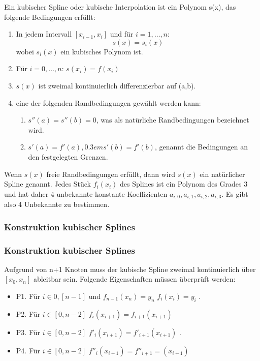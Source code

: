 {		
		Ein kubischer Spline oder kubische Interpolation ist ein Polynom s(x), das folgende Bedingungen erfüllt:
		\begin{enumerate}
			\item In jedem Intervall \([x_{i-1}, x_i]\) und für \(i= 1, \dots , n\):\[ s(x) = s_i(x)\] wobei \(s_i(x)\) ein kubisches Polynom ist.
			\item Für \(i=0,\dots,n\):\hspace{0.7em} \(s(x_i)=f(x_i)\)
			\item \(s(x)\) ist zweimal kontinuierlich differenzierbar auf (a,b).
			\item eine der folgenden Randbedingungen gewählt werden kann:
			\begin{enumerate}
				\item \(s''(a)=s''(b)=0\), was als natürliche Randbedingungen bezeichnet wird.
				\item \(s'(a)=f'(a) ,{0.3em} s'(b)=f'(b)\), genannt die Bedingungen an den festgelegten Grenzen.
			\end{enumerate}
		\end{enumerate}
		
		
		Wenn \(s(x)\) freie Randbedingungen erfüllt, dann wird \(s(x)\) ein natürlicher Spline genannt. 
		Jedes Stück \(f_i(x_i)\) des Splines ist ein Polynom des Grades 3 und hat daher 4 unbekannte konstante Koeffizienten \(a_{i,0},a_{i,1},a_{i,2},a_{i,3}\). Es gibt also 4 Unbekannte zu bestimmen.
		
		\subsubsection{Konstruktion kubischer Splines}
		\begin{frame}
			\frametitle{Konstruktion kubischer Splines}
			Aufgrund von n+1 Knoten muss der kubische Spline zweimal kontinuierlich über \([x_0,x_n]\) ableitbar sein. 
			Folgende Eigenschaften müssen überprüft werden:
			\begin{itemize}
				\item P1. Für \(i \in 0,[n-1]\) und \(f_{n-1}(x_n)=y_n\) \(f_i(x_i)=y_i\)	 .
				
				\item P2. Für \(i \in [0,n-2]\) \(f_i(x_{i+1})=f_{i+1}(x_{i+1})\)
				
				\item P3. Für \(i \in [0,n-2]\) \(f'_i(x_{i+1})=f'_{i+1}(x_{i+1})\) .
				
				\item P4. Für \(i \in [0,n-2]\) \(f''_i(x_{i+1})=f''_{i+1}=(x_{i+1})\)
			\end{itemize}
			

\end{frame}}
